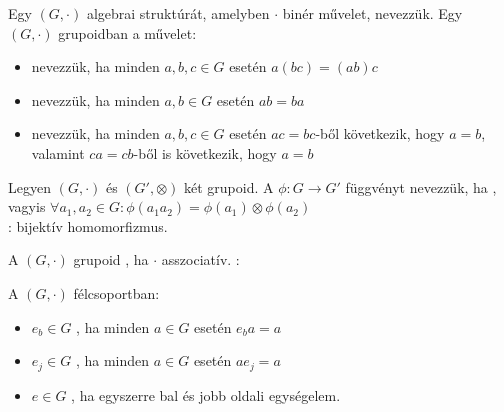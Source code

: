 \begin{frame}
  \begin{tcolorbox}[title={Def.: Grupoid}]
    Egy $(G, {\cdot})$ algebrai struktúrát, amelyben $\cdot$ binér művelet,  nevezzük.
  \tcblower
    Egy $(G, {\cdot})$ grupoidban a művelet:\\

    \begin{itemize}
      \item {} nevezzük, ha minden $a, b, c \in G$ esetén $a(bc) = (ab)c$
      \item {} nevezzük, ha minden $a, b \in G$ esetén $ab = ba$
      \item {} nevezzük, ha minden $a, b, c \in G$ esetén $ac = bc$-ből következik, hogy $a = b$, valamint $ca = cb$-ből is következik, hogy $a = b$
    \end{itemize}
  \end{tcolorbox}

  \begin{tcolorbox}[title={Def.: Morfizmusok}]
    Legyen $(G, {\cdot})$ és $(G', {\otimes})$ két grupoid. A ${\phi} : G \rightarrow G'$ függvényt  nevezzük, ha , vagyis ${\forall}a_1, a_2 \in G : {\phi}(a_1a_2) = {\phi}(a_1) \otimes {\phi}(a_2)$\\

    : bijektív homomorfizmus.
  \end{tcolorbox}

  \begin{tcolorbox}[title={Def.: Félcsoport}]
    A $(G, {\cdot})$ grupoid , ha $\cdot$ asszociatív.
  \tcblower
    :\\
    \mmedskip
    
    A $(G, {\cdot})$  félcsoportban:\\
    \begin{itemize}
      \item $e_b \in G$ , ha minden $a \in G$ esetén $e_ba = a$
      \item $e_j \in G$ , ha minden $a \in G$ esetén $ae_j = a$
      \item $e \in G$ , ha egyszerre bal és jobb oldali egységelem.
    \end{itemize}
  \end{tcolorbox}
\end{frame}

